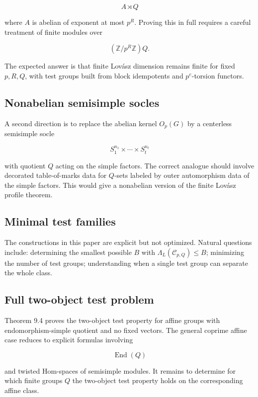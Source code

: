 \documentclass[11pt]{article}
\begin{document}
\[
A\rtimes Q
\]

where $A$ is abelian of exponent at most $p^R$. Proving this in full requires a careful treatment of finite modules over

\[
(\mathbb Z/p^R\mathbb Z)Q.
\]

The expected answer is that finite Lovász dimension remains finite for fixed $p,R,Q$, with test groups built from block idempotents and $p^e$-torsion functors.

\subsection{Nonabelian semisimple socles}

A second direction is to replace the abelian kernel $O_p(G)$ by a centerless semisimple socle

\[
S_1^{n_1}\times\cdots\times S_t^{n_t}
\]

with quotient $Q$ acting on the simple factors. The correct analogue should involve decorated table-of-marks data for $Q$-sets labeled by outer automorphism data of the simple factors. This would give a nonabelian version of the finite Lovász profile theorem.

\subsection{Minimal test families}

The constructions in this paper are explicit but not optimized. Natural questions include: determining the smallest possible $B$ with $\Lambda_L(\mathcal C_{p,Q})\le B$; minimizing the number of test groups; understanding when a single test group can separate the whole class.

\subsection{Full two-object test problem}

Theorem 9.4 proves the two-object test property for affine groups with endomorphism-simple quotient and no fixed vectors. The general coprime affine case reduces to explicit formulas involving

\[
\operatorname{End}(Q)
\]

and twisted Hom-spaces of semisimple modules. It remains to determine for which finite groups $Q$ the two-object test property holds on the corresponding affine class.
\end{document}
